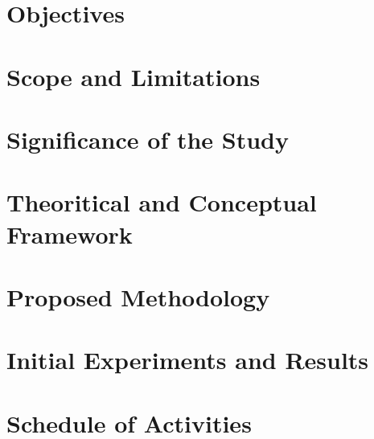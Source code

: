 \documentclass[a4paper, 12pt]{report}
\begin{document}
\chapter{Objectives}

\chapter{Scope and Limitations}

\chapter{Significance of the Study}

\chapter{Theoritical and Conceptual Framework}

\chapter{Proposed Methodology}

\chapter{Initial Experiments and Results}

\chapter{Schedule of Activities}

% 
% 

\printbibliography[title=References]
\end{document}
